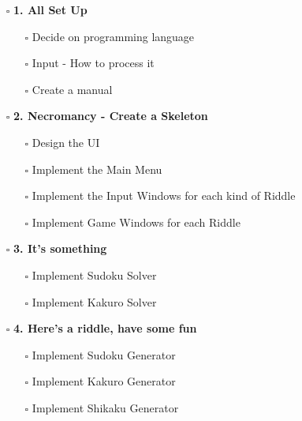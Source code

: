 \documentclass{article}
\begin{document}
	\begin{minipage}[t]{0.45\textwidth}
		\strut\vspace*{-\baselineskip}\newline
		\begin{itemize}
			\item[$\square$] \textbf{1. All Set Up}
			\begin{itemize}
				\item[$\square$] Decide on programming language
				\item[$\square$] Input - How to process it
				\item[$\square$] Create a manual
			\end{itemize}
			\item[$\square$] \textbf{2. Necromancy - Create a Skeleton}
			\begin{itemize}
				\item[$\square$] Design the UI
				\item[$\square$] Implement the Main Menu
				\item[$\square$] Implement the Input Windows for each kind of Riddle
				\item[$\square$] Implement Game Windows for each Riddle
			\end{itemize}
			\item[$\square$] \textbf{3. It's something}
			\begin{itemize}
				\item[$\square$] Implement Sudoku Solver
				\item[$\square$] Implement Kakuro Solver
			\end{itemize}
			\item[$\square$] \textbf{4. Here's a riddle, have some fun}
			\begin{itemize}
				\item[$\square$] Implement Sudoku Generator
				\item[$\square$] Implement Kakuro Generator
				\item[$\square$] Implement Shikaku Generator
			\end{itemize}
		\end{itemize}
	\end{minipage}
	\hspace*{.1\textwidth}
\end{document}
